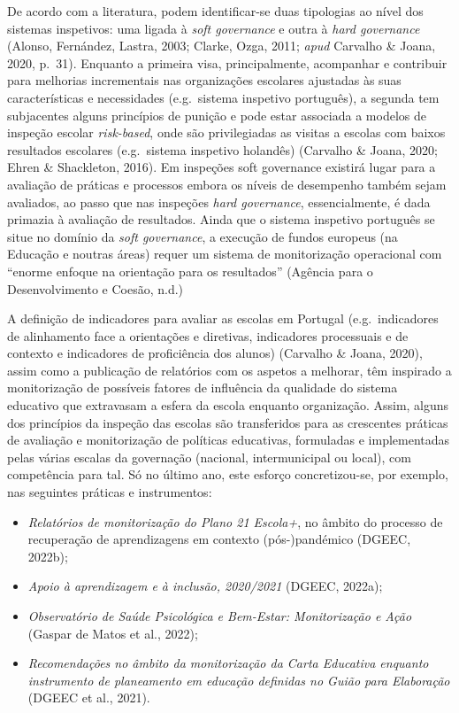 \documentclass[
]{book}
\providecommand{\tightlist}{%
  \setlength{\itemsep}{0pt}\setlength{\parskip}{0pt}}
\begin{document}
De acordo com a literatura, podem identificar-se duas tipologias ao nível dos sistemas inspetivos: uma ligada à \emph{soft governance} e outra à \emph{hard governance} (Alonso, Fernández, Lastra, 2003; Clarke, Ozga, 2011; \emph{apud} Carvalho \& Joana, 2020, p.~31). Enquanto a primeira visa, principalmente, acompanhar e contribuir para melhorias incrementais nas organizações escolares ajustadas às suas características e necessidades (e.g.~sistema inspetivo português), a segunda tem subjacentes alguns princípios de punição e pode estar associada a modelos de inspeção escolar \emph{risk-based}, onde são privilegiadas as visitas a escolas com baixos resultados escolares (e.g.~sistema inspetivo holandês) (Carvalho \& Joana, 2020; Ehren \& Shackleton, 2016). Em inspeções soft governance existirá lugar para a avaliação de práticas e processos embora os níveis de desempenho também sejam avaliados, ao passo que nas inspeções \emph{hard governance}, essencialmente, é dada primazia à avaliação de resultados. Ainda que o sistema inspetivo português se situe no domínio da \emph{soft governance}, a execução de fundos europeus (na Educação e noutras áreas) requer um sistema de monitorização operacional com ``enorme enfoque na orientação para os resultados'' (Agência para o Desenvolvimento e Coesão, n.d.)

A definição de indicadores para avaliar as escolas em Portugal (e.g.~indicadores de alinhamento face a orientações e diretivas, indicadores processuais e de contexto e indicadores de proficiência dos alunos) (Carvalho \& Joana, 2020), assim como a publicação de relatórios com os aspetos a melhorar, têm inspirado a monitorização de possíveis fatores de influência da qualidade do sistema educativo que extravasam a esfera da escola enquanto organização. Assim, alguns dos princípios da inspeção das escolas são transferidos para as crescentes práticas de avaliação e monitorização de políticas educativas, formuladas e implementadas pelas várias escalas da governação (nacional, intermunicipal ou local), com competência para tal. Só no último ano, este esforço concretizou-se, por exemplo, nas seguintes práticas e instrumentos:

\begin{itemize}
\tightlist
\item
  \emph{Relatórios de monitorização do Plano 21 Escola+}, no âmbito do processo de recuperação de aprendizagens em contexto (pós-)pandémico (DGEEC, 2022b);
\item
  \emph{Apoio à aprendizagem e à inclusão, 2020/2021} (DGEEC, 2022a);
\item
  \emph{Observatório de Saúde Psicológica e Bem-Estar: Monitorização e Ação} (Gaspar de Matos et al., 2022);
\item
  \emph{Recomendações no âmbito da monitorização da Carta Educativa enquanto instrumento de planeamento em educação definidas no Guião para Elaboração} (DGEEC et al., 2021).
\end{itemize}
\end{document}
